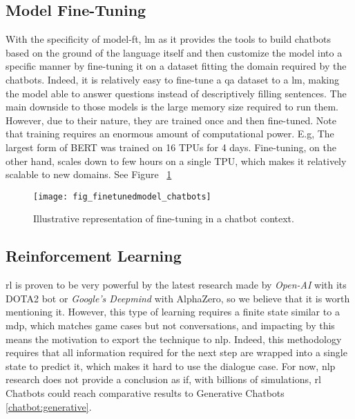 \subsection{Model Fine-Tuning}
\label{chatbot:finetuning}
With the specificity of \gls{model-ft}, {lm} as it provides the tools to build chatbots based on the ground of the language itself and then customize the model into a specific manner by fine-tuning it on a dataset fitting the domain required by the chatbots. Indeed, it is relatively easy to fine-tune a \gls{qa} dataset to a \gls{lm}, making the model able to answer questions instead of descriptively filling sentences. The main downside to those models is the large memory size required to run them. However, due to their nature, they are trained once and then fine-tuned. Note that training requires an enormous amount of computational power. E.g, The largest form of BERT \autocite{paper:devlin-etal-2019-bert} was trained on 16 TPUs for 4 days. Fine-tuning, on the other hand, scales down to few hours on a single TPU, which makes it relatively scalable to new domains. See Figure ~\ref{fig:fig_finetunedmodel_chatbots} 

\begin{figure}[H]
    \centering
    \texttt{[image: fig\_finetunedmodel\_chatbots]}
    \caption{Illustrative representation of fine-tuning in a chatbot context.}
    \label{fig:fig_finetunedmodel_chatbots}
\end{figure}

\subsection{Reinforcement Learning}
\gls{rl} is proven to be very powerful by the latest research made by \textit{Open-AI} with its DOTA2 bot or \textit{Google's Deepmind} with AlphaZero, so we believe that it is worth mentioning it. However, this type of learning requires a finite state similar to a \gls{mdp}, which matches game cases but not conversations, and impacting by this means the motivation to export the technique to \gls{nlp}. Indeed, this methodology requires that all information required for the next step are wrapped into a single state to predict it, which makes it hard to use the dialogue case. For now, \gls{nlp} research does not provide a conclusion as if, with billions of simulations, \gls{rl} Chatbots could reach comparative results to Generative Chatbots \ref{chatbot:generative}.

